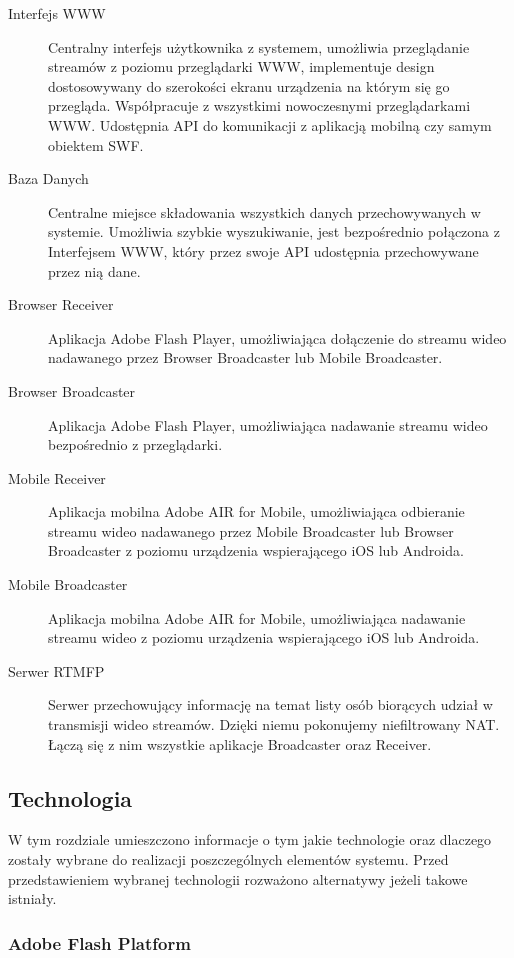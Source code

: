 \begin{description}
    \item[Interfejs WWW]{Centralny interfejs użytkownika z systemem, umożliwia przeglądanie streamów z poziomu przeglądarki WWW, implementuje design dostosowywany do szerokości ekranu urządzenia na którym się go przegląda. Współpracuje z wszystkimi nowoczesnymi przeglądarkami WWW. Udostępnia API do komunikacji z aplikacją mobilną czy samym obiektem SWF.}
    \item[Baza Danych]{Centralne miejsce składowania wszystkich danych przechowywanych w systemie. Umożliwia szybkie wyszukiwanie, jest bezpośrednio połączona z Interfejsem WWW, który przez swoje API udostępnia przechowywane przez nią dane.}
    \item[Browser Receiver]{Aplikacja Adobe Flash Player, umożliwiająca dołączenie do streamu wideo nadawanego przez Browser Broadcaster lub Mobile Broadcaster.}
    \item[Browser Broadcaster]{Aplikacja Adobe Flash Player, umożliwiająca nadawanie streamu wideo bezpośrednio z przeglądarki.}
    \item[Mobile Receiver]{Aplikacja mobilna Adobe AIR for Mobile, umożliwiająca odbieranie streamu wideo nadawanego przez Mobile Broadcaster lub Browser Broadcaster z poziomu urządzenia wspierającego iOS lub Androida.}
    \item[Mobile Broadcaster]{Aplikacja mobilna Adobe AIR for Mobile, umożliwiająca nadawanie streamu wideo z poziomu urządzenia wspierającego iOS lub Androida.}
    \item[Serwer RTMFP]{Serwer przechowujący informację na temat listy osób biorących udział w transmisji wideo streamów. Dzięki niemu pokonujemy niefiltrowany NAT. Łączą się z nim wszystkie aplikacje Broadcaster oraz Receiver.}
\end{description}

\subsection{Technologia}
\label{sec:EtapItechnologia}

W tym rozdziale umieszczono informacje o tym jakie technologie oraz dlaczego zostały wybrane do realizacji poszczególnych elementów systemu. Przed przedstawieniem wybranej technologii rozważono alternatywy jeżeli takowe istniały.

\subsubsection{Adobe Flash Platform}
\label{sec:EtapItechnologiaAFP}

